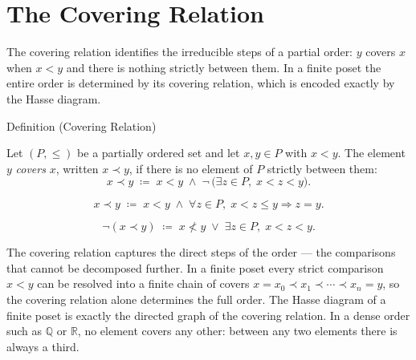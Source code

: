 
\section{The Covering Relation}
\label{sec:covering-relation}

\begin{remark*}
The covering relation identifies the irreducible steps of a partial order:
$y$ covers $x$ when $x < y$ and there is nothing strictly between them.
In a finite poset the entire order is determined by its covering relation,
which is encoded exactly by the Hasse diagram.
\end{remark*}


\begin{definitionbox}{Definition (Covering Relation)}
\begin{definition}
\label{def:covering-relation}
Let $(P, \leq)$ be a partially ordered set and let $x, y \in P$ with
$x < y$.  The element $y$ \emph{covers} $x$, written $x \prec y$, if
there is no element of $P$ strictly between them:
\[
x \prec y
\;\coloneqq\;
x < y
\;\land\;
\neg\,\bigl(\exists z \in P,\; x < z < y\bigr).
\]
\end{definition}
\end{definitionbox}

\begin{remark*}
\[
x \prec y
\;\coloneqq\;
x < y
\;\land\;
\forall z \in P,\; x < z \leq y \Longrightarrow z = y.
\]
\end{remark*}

\begin{remark*}
\[
\neg(x \prec y)
\;\coloneqq\;
x \not< y \;\lor\; \exists z \in P,\; x < z < y.
\]
\end{remark*}

\begin{remark*}[Interpretation]
The covering relation captures the direct steps of the order --- the
comparisons that cannot be decomposed further.  In a finite poset every
strict comparison $x < y$ can be resolved into a finite chain of covers
$x = x_0 \prec x_1 \prec \cdots \prec x_n = y$, so the covering relation
alone determines the full order.  The Hasse diagram of a finite poset is
exactly the directed graph of the covering relation.  In a dense order
such as $\mathbb{Q}$ or $\mathbb{R}$, no element covers any other: between
any two elements there is always a third.
\end{remark*}

